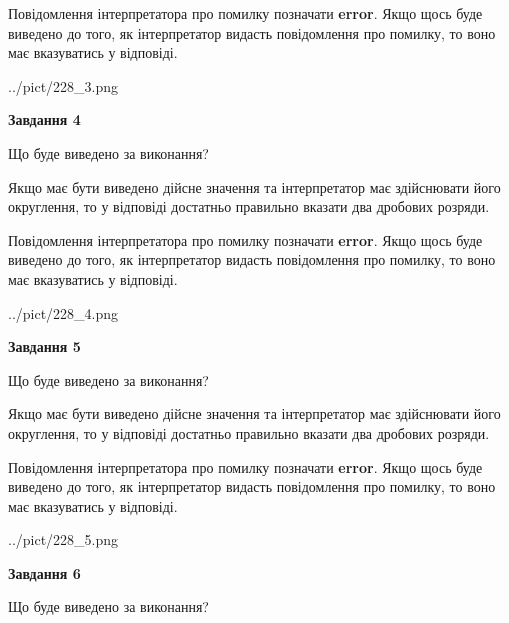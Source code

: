 \documentclass[12pt, ukrainian]{article}
\begin{document}
{\begin {Large}
Повідомлення інтерпретатора про помилку позначати \textbf{error}.
Якщо щось буде виведено до того, як інтерпретатор видасть повідомлення про помилку, 
то воно має вказуватись у відповіді. \par

\begin{center}
	{../pict/228_3.png}
\end{center}
\newpage

{\begin {center}\textbf{Завдання 4}\end {center}}\par
Що буде виведено за виконання? \par

Якщо має бути виведено дійсне значення та інтерпретатор має здійснювати його округлення, 
то у відповіді достатньо правильно вказати два дробових розряди.

Повідомлення інтерпретатора про помилку позначати \textbf{error}.
Якщо щось буде виведено до того, як інтерпретатор видасть повідомлення про помилку, 
то воно має вказуватись у відповіді. \par

\begin{center}
	{../pict/228_4.png}
\end{center}
\newpage

{\begin {center}\textbf{Завдання 5}\end {center}}\par
Що буде виведено за виконання? \par

Якщо має бути виведено дійсне значення та інтерпретатор має здійснювати його округлення, 
то у відповіді достатньо правильно вказати два дробових розряди.

Повідомлення інтерпретатора про помилку позначати \textbf{error}.
Якщо щось буде виведено до того, як інтерпретатор видасть повідомлення про помилку, 
то воно має вказуватись у відповіді. \par

\begin{center}
	{../pict/228_5.png}
\end{center}
\newpage

{\begin {center}\textbf{Завдання 6}\end {center}}\par
Що буде виведено за виконання? \par


\end{Large}}
\end{document}
